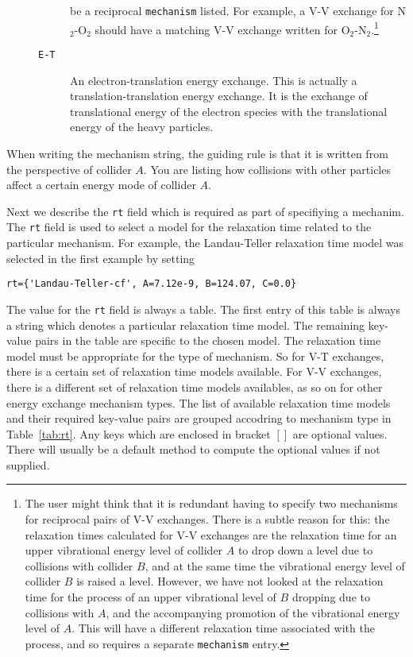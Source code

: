 \begin{description}
\begin{description}
                      be a reciprocal \texttt{mechanism} listed. For example, a V-V exchange
                      for N$_2$-O$_2$ should have a matching V-V exchange written for O$_2$-N$_2$.\footnote{
                      The user might think that it is redundant having to specify two mechanisms
                      for reciprocal pairs of V-V exchanges. There is a subtle  reason for this:
                      the relaxation times calculated for V-V exchanges are the relaxation time
                      for an upper vibrational energy level of collider $A$ to drop down a level
                      due to collisions with collider $B$, and at the same time the vibrational energy
                      level of collider $B$ is raised a level. However, we have not looked at the
                      relaxation time for the process of an upper vibrational level of $B$ dropping
                      due to collisions with $A$, and the accompanying promotion of the vibrational
                      energy level of $A$. This will have a different relaxation time associated with
                      the process, and so requires a separate \texttt{mechanism} entry.}
  \item[\texttt{E-T}] An electron-translation energy exchange. This is actually a translation-translation
                      energy exchange. It is the exchange of translational energy of the electron species
                      with the translational energy of the heavy particles.
  \end{description}
\end{description}

When writing the mechanism string, the guiding rule is that it is written from the perspective
of collider $A$.
You are listing how collisions with other particles affect a certain energy mode of collider $A$.

Next we describe the \texttt{rt} field which is required as part of specifiying a mechanim.
The \texttt{rt} field is used to select a model for the relaxation time related to the particular
mechanism.
For example, the Landau-Teller relaxation time model was selected
in the first example by setting
\begin{verbatim}
rt={'Landau-Teller-cf', A=7.12e-9, B=124.07, C=0.0}
\end{verbatim}
The value for the \texttt{rt} field is always a table.
The first entry of this table is always a string which denotes a particular
relaxation time model.
The remaining key-value pairs in the table are specific to the chosen model.
The relaxation time model must be appropriate for the type of mechanism.
So for V-T exchanges, there is a certain set of relaxation time models available.
For V-V exchanges, there is a different set of relaxation time models availables,
as so on for other energy exchange mechanism types.
The list of available relaxation time models and their required key-value pairs
are grouped accodring to mechanism type in Table~\ref{tab:rt}.
Any keys which are enclosed in bracket $[ ]$ are optional values.
There will usually be a default method to compute the optional values if not supplied.

